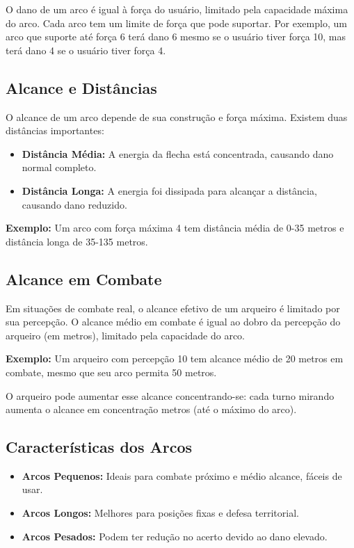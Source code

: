 O dano de um arco é igual à força do usuário, limitado pela capacidade máxima do arco. Cada arco tem um limite de força que pode suportar. Por exemplo, um arco que suporte até força 6 terá dano 6 mesmo se o usuário tiver força 10, mas terá dano 4 se o usuário tiver força 4.

\subsection{Alcance e Distâncias}

O alcance de um arco depende de sua construção e força máxima. Existem duas distâncias importantes:

\begin{itemize}
	\item \textbf{Distância Média:} A energia da flecha está concentrada, causando dano normal completo.
	\item \textbf{Distância Longa:} A energia foi dissipada para alcançar a distância, causando dano reduzido.
\end{itemize}

\textbf{Exemplo:} Um arco com força máxima 4 tem distância média de 0-35 metros e distância longa de 35-135 metros.

\subsection{Alcance em Combate}

Em situações de combate real, o alcance efetivo de um arqueiro é limitado por sua percepção. O alcance médio em combate é igual ao dobro da percepção do arqueiro (em metros), limitado pela capacidade do arco.

\textbf{Exemplo:} Um arqueiro com percepção 10 tem alcance médio de 20 metros em combate, mesmo que seu arco permita 50 metros.

O arqueiro pode aumentar esse alcance concentrando-se: cada turno mirando aumenta o alcance em concentração metros (até o máximo do arco).

\subsection{Características dos Arcos}

\begin{itemize}
	\item \textbf{Arcos Pequenos:} Ideais para combate próximo e médio alcance, fáceis de usar.
	\item \textbf{Arcos Longos:} Melhores para posições fixas e defesa territorial.
	\item \textbf{Arcos Pesados:} Podem ter redução no acerto devido ao dano elevado.
\end{itemize}

